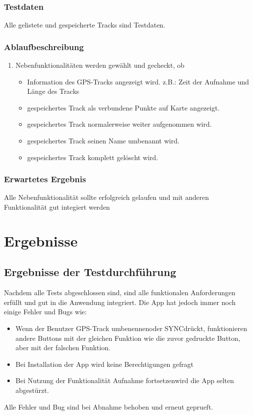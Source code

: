 \documentclass{article}
\begin{document}
\subsubsection{Testdaten}
	Alle gelistete und gespeicherte Tracks sind Testdaten.
\subsubsection{Ablaufbeschreibung}
	\begin{enumerate}
		\item Nebenfunktionalitäten werden gewählt und gecheckt, ob
			\begin{itemize}
				\item Information des GPS-Tracks angezeigt wird. z.B.: Zeit der Aufnahme und Länge des Tracks
				\item gespeichertes Track als verbundene Punkte auf Karte angezeigt.
				\item gespeichertes Track normalerweise weiter aufgenommen wird.
				\item gespeichertes Track seinen Name umbenannt wird.
				\item gespeichertes Track komplett gelöscht wird.
			\end{itemize}
	\end{enumerate}
\subsubsection{Erwartetes Ergebnis}
	Alle Nebenfunktionalität sollte erfolgreich gelaufen und mit anderen Funktionalität gut integiert werden

\section{Ergebnisse}
\subsection{Ergebnisse der Testdurchführung}
	Nachdem alle Tests abgeschlossen sind, sind alle funktionalen Anforderungen erfüllt und gut in die Anwendung integriert. Die App hat jedoch immer noch einige Fehler und Bugs wie:
	\begin{itemize}
		\item Wenn der Benutzer \glqq GPS-Track umbenennen\grqq oder \glqq SYNC\grqq drückt, funktionieren andere Buttons mit der gleichen Funktion wie die zuvor gedruckte Button, aber mit der falschen Funktion.
		\item Bei Installation der App wird keine Berechtigungen gefragt
		\item Bei Nutzung der Funktionalität \glqq Aufnahme fortsetzen\grqq wird die App selten abgestürzt.
	\end{itemize}
	Alle Fehler und Bug sind bei Abnahme behoben und erneut geprueft.
\end{document}

